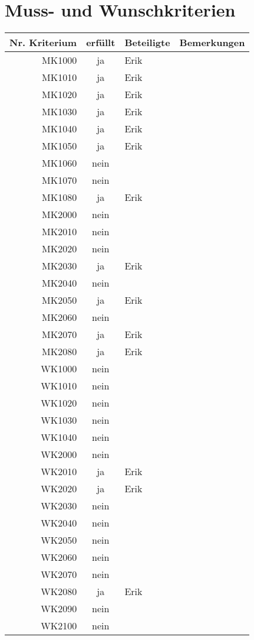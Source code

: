 \chapter{Muss- und Wunschkriterien}
\begin{tabular}{r|c|l|l}
	\textbf{Nr. Kriterium} & \textbf{erfüllt} & \textbf{Beteiligte} & \textbf{Bemerkungen} \\
	\hline
	MK1000 & ja & Erik & \\
	MK1010 & ja & Erik & \\
	MK1020 & ja & Erik & \\
	MK1030 & ja & Erik & \\
	MK1040 & ja & Erik & \\
	MK1050 & ja & Erik & \\
	MK1060 & nein &  & \\
	MK1070 & nein &  & \\
	MK1080 & ja & Erik & \\
	MK2000 & nein &  & \\
	MK2010 & nein &  & \\
	MK2020 & nein &  & \\
	MK2030 & ja & Erik & \\
	MK2040 & nein &  & \\
	MK2050 & ja & Erik & \\
	MK2060 & nein &  & \\
	MK2070 & ja & Erik & \\
	MK2080 & ja & Erik & \\
	\hline\hline
	WK1000 & nein &  & \\
	WK1010 & nein &  & \\
	WK1020 & nein &  & \\
	WK1030 & nein &  & \\
	WK1040 & nein &  & \\
	WK2000 & nein &  & \\
	WK2010 & ja & Erik & \\
	WK2020 & ja & Erik & \\
	WK2030 & nein &  & \\
	WK2040 & nein &  & \\
	WK2050 & nein &  & \\
	WK2060 & nein &  & \\
	WK2070 & nein &  & \\
	WK2080 & ja & Erik & \\
	WK2090 & nein &  & \\
	WK2100 & nein &  & \\
	
\end{tabular}